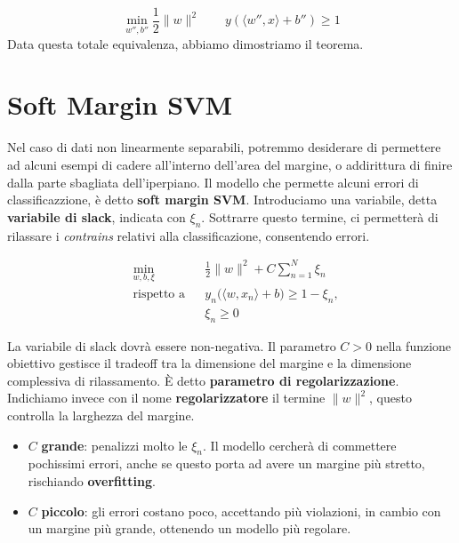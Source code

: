 $$
\min_{w'',b''} \frac12\|w\|^2 \qquad y (\langle w'', x\rangle + b'') \geq 1
$$
Data questa totale equivalenza, abbiamo dimostriamo il teorema.

\section{Soft Margin SVM}
Nel caso di dati non linearmente separabili, potremmo desiderare di permettere ad alcuni esempi di cadere all'interno dell'area del margine, o addirittura di finire dalla parte sbagliata dell'iperpiano. Il modello che permette alcuni errori di classificazzione, è detto \textbf{soft margin SVM}. Introduciamo una variabile, detta \textbf{variabile di slack}, indicata con $\xi_n$. Sottrarre questo termine, ci permetterà di rilassare i \textit{contrains} relativi alla classificazione, consentendo errori.

$$
\begin{aligned}
	&\min_{w,b,\xi} && \frac{1}{2}\|w\|^{2} + C \sum_{n=1}^{N} \xi_n \\
	&\text{rispetto a} && y_n \big( \langle w, x_n \rangle + b \big) \ge 1 - \xi_n, \\
	& && \xi_n \ge 0
\end{aligned}
$$

La variabile di slack dovrà essere non-negativa. Il parametro $C>0$ nella funzione obiettivo gestisce il tradeoff tra la dimensione del margine e la dimensione complessiva di rilassamento. È detto \textbf{parametro di regolarizzazione}. Indichiamo invece con il nome \textbf{regolarizzatore} il termine $\|w\|^2$, questo controlla la larghezza del margine. 

\begin{itemize}
	\item $C$ \textbf{grande}: penalizzi molto le $\xi_n$. Il modello cercherà di commettere pochissimi errori, anche se questo porta ad avere un margine più stretto, rischiando \textbf{overfitting}.
	\item $C$ \textbf{piccolo}: gli errori costano poco, accettando più violazioni, in cambio con un margine più grande, ottenendo un modello più regolare.
\end{itemize}


